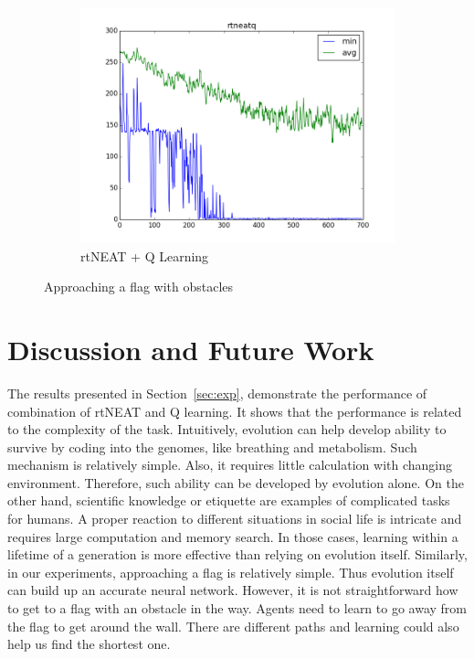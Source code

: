 \documentclass[letterpaper]{article}
\begin{document}
\begin{figure}[ht]
\begin{subfigure}{0.7\columnwidth}
  \includegraphics[width=\columnwidth]{wall_rtneatq.png}
  \caption{rtNEAT + Q Learning}
  \label{fig:wall_neatq}
\end{subfigure}
\caption{Approaching a flag with obstacles}
\label{fig:wall}
\end{figure}

\section{Discussion and Future Work}
The results presented in Section~\ref{sec:exp}, demonstrate the performance of combination of rtNEAT and Q learning. It shows that the performance is related to the complexity of the task. Intuitively, evolution can help develop ability to survive by coding into the genomes, like breathing and metabolism. Such mechanism is relatively simple. Also, it requires little calculation with changing environment. Therefore, such ability can be developed by evolution alone. On the other hand, scientific knowledge or etiquette are examples of complicated tasks for humans. A proper reaction to different situations in social life is intricate and requires large computation and memory search. In those cases, learning within a lifetime of a generation is more effective than relying on evolution itself. Similarly, in our experiments, approaching a flag is relatively simple. Thus evolution itself can build up an accurate neural network. However, it is not straightforward how to get to a flag with an obstacle in the way. Agents need to learn to go away from the flag to get around the wall. There are different paths and learning could also help us find the shortest one.
\end{document}
